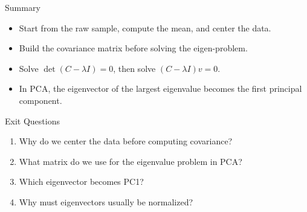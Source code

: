 \documentclass[aspectratio=169]{beamer}
\begin{document}
\begin{frame}{Summary}
  \begin{itemize}
    \item Start from the raw sample, compute the mean, and center the data.
    \item Build the covariance matrix before solving the eigen-problem.
    \item Solve $\det(C-\lambda I)=0$, then solve $(C-\lambda I)v=0$.
    \item In PCA, the eigenvector of the largest eigenvalue becomes the first principal component.
  \end{itemize}
  \slidesources{\AIMLMiscSources}
\end{frame}

\begin{frame}{Exit Questions}
  \begin{enumerate}
    \item Why do we center the data before computing covariance?
    \item What matrix do we use for the eigenvalue problem in PCA?
    \item Which eigenvector becomes PC1?
    \item Why must eigenvectors usually be normalized?
  \end{enumerate}
\end{frame}
\end{document}
